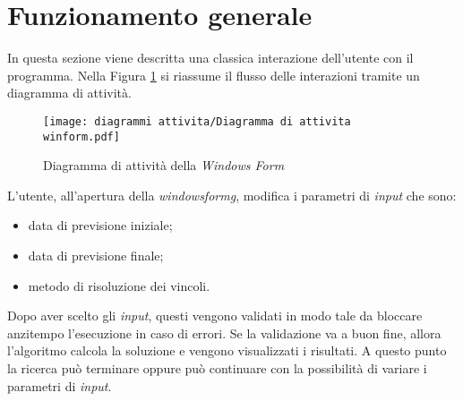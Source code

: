 \section{Funzionamento generale}
\noindent In questa sezione viene descritta una classica interazione dell'utente con il programma.
Nella Figura \ref{diagramma-attivita-Windows form} si riassume il flusso delle interazioni tramite un diagramma di attività. \cite{site:rcardin}

\begin{figure}[!h] 
    \centering 
    \texttt{[image: diagrammi attivita/Diagramma di attivita winform.pdf]} 
    \caption{Diagramma di attività della \textit{Windows Form}}
    \label{diagramma-attivita-Windows form}
\end{figure}

\noindent L'utente, all'apertura della \textit{\gls{windowsformg}}, modifica i parametri di \textit{input} che sono:
\begin{itemize}
    \item data di previsione iniziale;
    \item data di previsione finale;
    \item metodo di risoluzione dei vincoli.
\end{itemize}
\noindent Dopo aver scelto gli \textit{input}, questi vengono validati in modo tale da bloccare anzitempo
l'esecuzione in caso di errori.
Se la validazione va a buon fine, allora l'algoritmo calcola la soluzione e vengono visualizzati i risultati.
A questo punto la ricerca può terminare oppure può continuare con la possibilità di variare i parametri di \textit{input}.

